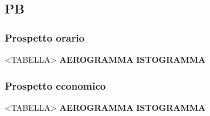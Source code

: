 \subsection{PB}

\subsubsection{Prospetto orario}

<TABELLA>
\textbf{AEROGRAMMA}
\textbf{ISTOGRAMMA}

\subsubsection{Prospetto economico}

<TABELLA>
\textbf{AEROGRAMMA}
\textbf{ISTOGRAMMA}

